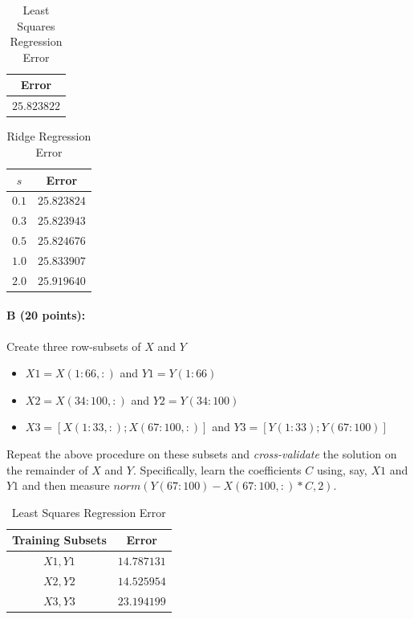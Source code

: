 \documentclass[11pt]{article}
\begin{document}
\begin{table}[!h] 
    \centering
    \caption{Least Squares Regression Error}
    \label{ErrOls}
    \begin{tabular}{|c|}
      \hline
    Error \\
      \hline      
      $25.823822$  \\
      \hline
    \end{tabular}
\end{table}
\begin{table}[!h] 
    \centering
    \caption{Ridge Regression Error}
    \label{ErrRidge}
    \begin{tabular}{|c|c|}
      \hline
   $s$  & Error \\
      \hline      
      $0.1$ &      $25.823824$  \\
      \hline
      $0.3$ &      $25.823943$  \\
      \hline
      $0.5$ &      $25.824676$  \\
      \hline
      $1.0$ &      $25.833907$  \\
      \hline
      $2.0$ &      $25.919640$  \\
      \hline
    \end{tabular}
\end{table}

\paragraph{B (20 points):}

Create three row-subsets of $X$ and $Y$

\begin{itemize}
\item $X1 = X(1:66,:)$ and $Y1 = Y(1:66)$
\item $X2 = X(34:100,:)$ and $Y2 = Y(34:100)$
\item $X3 = [X(1:33,:); X(67:100,:)]$ and $Y3 = [Y(1:33); Y(67:100)]$
\end{itemize}

Repeat the above procedure on these subsets and \textit{cross-validate} the solution on the remainder of $X$ and $Y$. Specifically, learn the coefficients $C$ using, say, $X1$ and $Y1$ and then measure $norm(Y(67:100) - X(67:100,:)*C,2)$.

\begin{table}[!h] 
    \centering
    \caption{Least Squares Regression Error}
    \label{ErrOls2}
    \begin{tabular}{|c|c|}
      \hline
   Training Subsets  & Error \\
      \hline      
      $X1, Y1$ &      $14.787131$  \\
      \hline
      $X2, Y2$ &      $14.525954$  \\
      \hline
      $X3, Y3$ &      $23.194199$  \\
      \hline
    \end{tabular}
\end{table}
\end{document}
